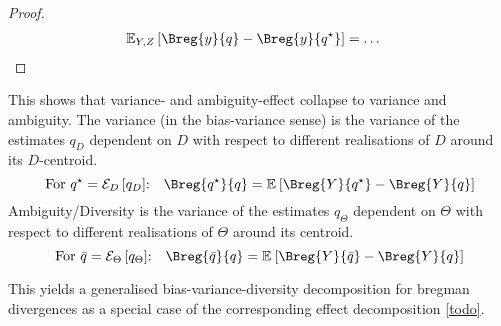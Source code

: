 \documentclass[../main.tex]{subfiles}
\begin{document}
\begin{proof}
\begin{align*}
\mathbb{E}_{Y,Z}\left[ \Breg{y}{q} - \Breg{y}{q^\star} \right]  &= \dots
\end{align*}
\end{proof}

This shows that variance- and ambiguity-effect collapse to variance and ambiguity. The variance (in the bias-variance sense) is the variance of the estimates $q_D$ dependent on $D$ with respect to different realisations of $D$ around its $D$-centroid. 
$$
\text{For $q^\star = \mathcal{E}_D\left[q_D\right]$:}\hspace{1em}
\Breg{q^\star}{q} = \mathbb{E}_{}\left[ \Breg{Y}{q^\star} - \Breg{Y}{q} \right]
$$
Ambiguity/Diversity is the variance of the estimates $q_\Theta$ dependent on $\Theta$ with respect to different realisations of $\Theta$ around its centroid.
$$
\text{For $\bar{q} = \mathcal{E}_\Theta\left[q_\Theta\right]$:}\hspace{1em}
\Breg{\bar{q}}{q} = \mathbb{E}_{}\left[ \Breg{Y}{\bar{q}} - \Breg{Y}{q} \right]
$$


This yields a generalised bias-variance-diversity decomposition for bregman divergences as a special case of the corresponding effect decomposition \ref{todo}.

\end{document}
